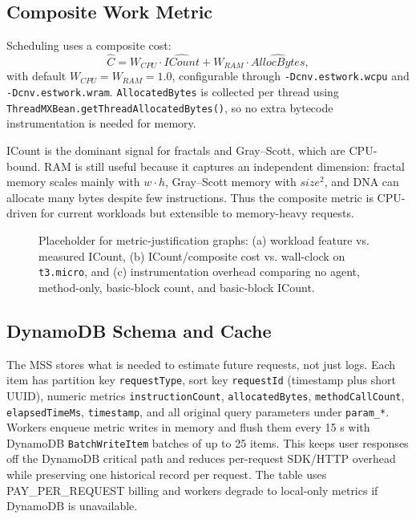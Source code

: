 \documentclass[10pt]{article}
\newcommand{\whiteplaceholder}[2]{%
  \begin{center}
  \fcolorbox{black}{white}{\rule{0pt}{#2}\rule{#1}{0pt}}
  \end{center}%
}
\begin{document}
\subsection{Composite Work Metric}

Scheduling uses a composite cost:
\[
\hat{C} = W_{CPU}\cdot \widehat{ICount} + W_{RAM}\cdot \widehat{AllocBytes},
\]
with default $W_{CPU}=W_{RAM}=1.0$, configurable through \texttt{-Dcnv.\allowbreak estwork.\allowbreak wcpu} and \texttt{-Dcnv.\allowbreak estwork.\allowbreak wram}. \texttt{AllocatedBytes} is collected per thread using \texttt{ThreadMXBean.getThreadAllocatedBytes()}, so no extra bytecode instrumentation is needed for memory.

ICount is the dominant signal for fractals and Gray--Scott, which are CPU-bound. RAM is still useful because it captures an independent dimension: fractal memory scales mainly with $w\cdot h$, Gray--Scott memory with $size^2$, and DNA can allocate many bytes despite few instructions. Thus the composite metric is CPU-driven for current workloads but extensible to memory-heavy requests.

\begin{figure}[H]
\whiteplaceholder{0.88\columnwidth}{0.66\columnwidth}
\caption{Placeholder for metric-justification graphs: (a) workload feature vs. measured ICount, (b) ICount/composite cost vs. wall-clock on \texttt{t3.micro}, and (c) instrumentation overhead comparing no agent, method-only, basic-block count, and basic-block ICount.}
\label{fig:metrics}
\end{figure}

\subsection{DynamoDB Schema and Cache}

The MSS stores what is needed to estimate future requests, not just logs. Each item has partition key \texttt{requestType}, sort key \texttt{requestId} (timestamp plus short UUID), numeric metrics \texttt{instruction\allowbreak Count}, \texttt{allocatedBytes}, \texttt{method\allowbreak Call\allowbreak Count}, \texttt{elapsedTimeMs}, \texttt{timestamp}, and all original query parameters under \texttt{param\_*}. Workers enqueue metric writes in memory and flush them every 15 s with DynamoDB \texttt{BatchWriteItem} batches of up to 25 items. This keeps user responses off the DynamoDB critical path and reduces per-request SDK/HTTP overhead while preserving one historical record per request. The table uses PAY\_PER\_REQUEST billing and workers degrade to local-only metrics if DynamoDB is unavailable.
\end{document}
